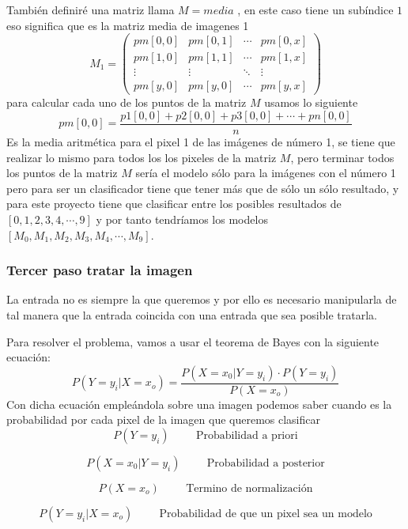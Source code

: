 \documentclass[
  spanish,
]{article}
\begin{document}
También definiré una matriz llama \(M=media\) , en este caso tiene un
subíndice \(1\) eso significa que es la matriz media de imagenes 1 \[
M_1= \begin{equation}
\begin{pmatrix}
pm[0,0] & pm[0,1] & \cdots & pm[0,x]\\
pm[1,0] & pm[1,1] & \cdots & pm[1,x]\\
\vdots & \vdots & \ddots & \vdots\\
pm[y,0] & pm[y,0] & \cdots & pm[y,x]
\end{pmatrix}
\end{equation}
\] para calcular cada uno de los puntos de la matriz \(M\) usamos lo
siguiente \[
pm[0,0]= \frac{p1[0,0]+ p2[0,0] + p3[0,0]+ \cdots + pn[0,0]}{n}
\] Es la media aritmética para el pixel 1 de las imágenes de número 1,
se tiene que realizar lo mismo para todos los los pixeles de la matriz
\(M\), pero terminar todos los puntos de la matriz \(M\) sería el modelo
sólo para la imágenes con el número 1 pero para ser un clasificador
tiene que tener más que de sólo un sólo resultado, y para este proyecto
tiene que clasificar entre los posibles resultados de
\([0,1,2,3,4,\cdots,9]\) y por tanto tendríamos los modelos
\([M_0,M_1,M_2,M_3,M_4,\cdots,M_9]\).

\hypertarget{tercer-paso-tratar-la-imagen}{%
\subsubsection{Tercer paso tratar la
imagen}\label{tercer-paso-tratar-la-imagen}}

La entrada no es siempre la que queremos y por ello es necesario
manipularla de tal manera que la entrada coincida con una entrada que
sea posible tratarla.

Para resolver el problema, vamos a usar el teorema de Bayes con la
siguiente ecuación: \[
P(Y=y_i|X=x_o)= \frac{P(X=x_0| Y=y_i)\cdot P(Y=y_i)}{P(X=x_o)}
\] Con dicha ecuación empleándola sobre una imagen podemos saber cuando
es la probabilidad por cada pixel de la imagen que queremos clasificar
\[
P(Y=y_i) \hspace{1cm} \text{Probabilidad a priori}
\]

\[
P(X=x_0| Y=y_i) \hspace{1cm} \text{Probabilidad a posterior}
\]

\[
P(X=x_o) \hspace{1cm} \text{Termino de normalización}
\]

\[
P(Y=y_i|X=x_o)  \hspace{1cm} \text{Probabilidad  de que un pixel sea un modelo}
\]
\end{document}
